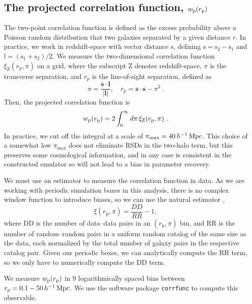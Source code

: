 \subsection{The projected correlation function, \texorpdfstring{$w_\mathrm{p}(r_\mathrm{p})$}{wp(rp)}}
\label{sec:wprp}

The two-point correlation function is defined as the excess probability above a Poisson random distribution that two galaxies separated by a given distance $r$.
In practice, we work in redshift-space with vector distance $\bm{\mathrm{s}}$, defining  $\bm{\mathrm{s}} = \bm{\mathrm{s}}_2 -  \bm{\mathrm{s}}_1$ and  $\bm{\mathrm{l}} = ( \bm{\mathrm{s}}_1 + \bm{\mathrm{s}}_2)/2$.
We measure the two-dimensional correlation function $\xi_\mathrm{Z}(r_\mathrm{p}, \pi)$ on a grid, where the subscript Z denotes redshift-space, $\pi$ is the transverse separation, and $r_\mathrm{p}$ is the line-of-sight separation, defined as
\begin{equation}
	\pi = \frac{\mathbf{s}\cdot\mathbf{l}}{|\mathbf{l}|}, 
	\quad r_{p}=\mathbf{s}\cdot\mathbf{s}-\pi^2 ~.
\end{equation}
Then, the projected correlation function is
\begin{equation}
	w_\mathrm{p}(r_\mathrm{p}) = 2 \int_{0}^{\infty} d\pi \, \xi_\mathrm{Z}(r_\mathrm{p}, \pi) ~.
\end{equation}
In practice, we cut off the integral at a scale of $\pi_\mathrm{max} = 40 \, h^{-1}\,\mathrm{Mpc}$.
This choice of a somewhat low $\pi_\mathrm{max}$ does not eliminate RSDs in the two-halo term, but this preserves some cosmological information, and in any case is consistent in the constructed emulator so will not lead to a bias in parameter recovery.

We must use an estimator to measure the correlation function in data.
As we are working with periodic simulation boxes in this analysis, there is no complex window function to introduce biases, so we can use the natural estimator \citep{PeeblesHauser1974},
\begin{equation}
	\xi(r_\mathrm{p}, \pi) = \frac{DD}{RR} - 1,
\end{equation}
where DD is the number of data--data pairs in an $(r_\mathrm{p}, \pi)$ bin, and RR is the number of random--random pairs in a uniform random catalog of the same size as the data, each normalized by the total number of galaxy pairs in the respective catalog pair.
Given our periodic boxes, we can analytically compute the RR term, so we only have to numerically compute the DD term.

We measure $w_\mathrm{p}(r_\mathrm{p})$ in 9 logarithmically spaced bins between $r_p = 0.1-50 \, h^{-1}\,\mathrm{Mpc}$.
We use the software package \texttt{corrfunc} \citep{SinhaGarrison2019, Sinha2020} to compute this observable.

